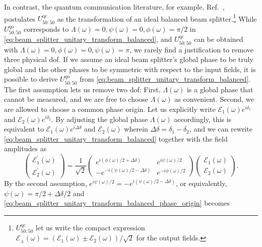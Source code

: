 In contrast, the quantum communication literature, for example, Ref.~\cite{Shapiro2009}, postulates $U_{50:50}^\text{qc}$ as the transformation of an ideal balanced beam splitter.\footnote{$U_{50:50}^\text{qc}$ let us write the compact expression $\mathcal{E}_\pm(\omega)=\left(\mathcal{E}_1(\omega)\pm\mathcal{E}_2(\omega)\right)/\sqrt{2}$ for the output fields.} 
While $U_{50:50}^\text{qo}$ corresponds to $\Lambda(\omega)=0,\psi(\omega)=0,\phi(\omega)=\pi/2$ in \cref{eq:beam_splitter_unitary_transform_balanced}, and $U_{50:50}^\text{qc}$ can be obtained with $\Lambda(\omega)=0,\phi(\omega)=0,\psi(\omega)=\pi$, we rarely find a justification to remove three physical \gls{dof}.
If we assume an ideal beam splitter's global phase to be truly global and the other phases to be symmetric with respect to the input fields, it is possible to derive $U_{50:50}^\text{qo}$ from \cref{eq:beam_splitter_unitary_transform_balanced}.
The first assumption lets us remove two \gls{dof}:
First, $\Lambda(\omega)$ is a global phase that cannot be measured, and we are free to choose $\Lambda(\omega)$ as convenient.
Second, we are allowed to choose a common phase origin.
Let us explicitly write $\mathcal{E}_1(\omega)e^{i\delta_1}$ and $\mathcal{E}_2(\omega)e^{i\delta_2}$.
By adjusting the global phase $\Lambda(\omega)$ accordingly, this is equivalent to $\mathcal{E}_1(\omega)e^{i\Delta\delta}$ and $\mathcal{E}_2(\omega)$ wherein $\Delta\delta=\delta_1-\delta_2$, and we can rewrite \cref{eq:beam_splitter_unitary_transform_balanced} together with the field amplitudes as
\begin{equation}
    \begin{pmatrix}
        \mathcal{E}_1^\prime(\omega)
        \\
        \mathcal{E}_2^\prime(\omega)
    \end{pmatrix}
    =
    \frac{1}{\sqrt{2}}
    \begin{pmatrix}
        e^{i(\phi(\omega)/2+\Delta\delta)} & e^{i\psi(\omega)/2}
        \\
        -e^{-i(\psi(\omega)/2-\Delta\delta)} & e^{-i\phi(\omega)/2}
    \end{pmatrix}
    \begin{pmatrix}
        \mathcal{E}_1(\omega)
        \\
        \mathcal{E}_2(\omega)
    \end{pmatrix}
    \label{eq:beam_splitter_unitary_transform_balanced_phase_origin}.
\end{equation}
By the second assumption, $e^{i\psi(\omega)/2}=-e^{i(\psi(\omega)/2-\Delta\delta)}$, or equivalently, $\psi(\omega)=\pi/2+\Delta\delta/2$ and \cref{eq:beam_splitter_unitary_transform_balanced_phase_origin} becomes
